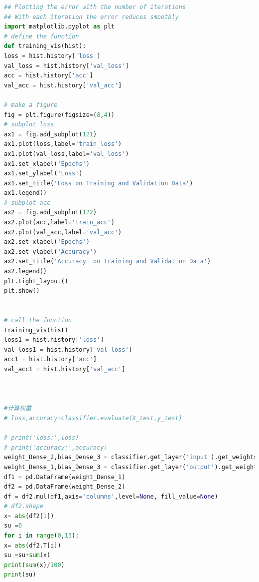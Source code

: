 \documentclass{whutmod}
\begin{document}
\begin{lstlisting}[language=python]
## Plotting the error with the number of iterations
## With each iteration the error reduces smoothly
import matplotlib.pyplot as plt
# define the function
def training_vis(hist):
loss = hist.history['loss']
val_loss = hist.history['val_loss']
acc = hist.history['acc']
val_acc = hist.history['val_acc']

# make a figure
fig = plt.figure(figsize=(8,4))
# subplot loss
ax1 = fig.add_subplot(121)
ax1.plot(loss,label='train_loss')
ax1.plot(val_loss,label='val_loss')
ax1.set_xlabel('Epochs')
ax1.set_ylabel('Loss')
ax1.set_title('Loss on Training and Validation Data')
ax1.legend()
# subplot acc
ax2 = fig.add_subplot(122)
ax2.plot(acc,label='train_acc')
ax2.plot(val_acc,label='val_acc')
ax2.set_xlabel('Epochs')
ax2.set_ylabel('Accuracy')
ax2.set_title('Accuracy  on Training and Validation Data')
ax2.legend()
plt.tight_layout()
plt.show()


# call the function
training_vis(hist)
loss1 = hist.history['loss']
val_loss1 = hist.history['val_loss']
acc1 = hist.history['acc']
val_acc1 = hist.history['val_acc']



#计算权重
# loss,accuracy=classifier.evaluate(X_test,y_test)

# print('loss:',loss)
# print('accuracy:',accuracy)
weight_Dense_2,bias_Dense_3 = classifier.get_layer('input').get_weights()
weight_Dense_1,bias_Dense_3 = classifier.get_layer('output').get_weights()
df1 = pd.DataFrame(weight_Dense_1)
df2 = pd.DataFrame(weight_Dense_2)
df = df2.mul(df1,axis='columns',level=None, fill_value=None)
# df2.shape
x= abs(df2[1])
su =0 
for i in range(0,15):
x= abs(df2.T[i])
su =su+sum(x)
print(sum(x)/100)
print(su)

\end{lstlisting}
\end{document}
